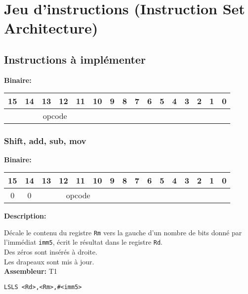 \section{Jeu d'instructions (Instruction Set Architecture)}

\subsection{Instructions à implémenter}

\textbf{Binaire:}\\

\begin{tabular}{| c c c c c c c c c c c c c c c c |}
\hline
15 & 14 & 13 & 12 & 11 & 10 & \multicolumn{1}{|c}{9} & 8 & 7 & 6 & 5 & 4 & 3 & 2 & 1 & 0 \\
\hline
\multicolumn{6}{|c}{opcode} & \multicolumn{10}{|c|}{} \\
\hline
\end{tabular}


\subsubsection{Shift, add, sub, mov}

\textbf{Binaire:}\\

\begin{tabular}{| c c c c c c c c c c c c c c c c |}
\hline
15 & 14 & \multicolumn{1}{|c}{13} & 12 & 11 & 10 & 9 & \multicolumn{1}{|c}{8} & 7 & 6 & 5 & 4 & 3 & 2 & 1 & 0 \\
\hline
0 & 0 & \multicolumn{5}{|c}{opcode} & \multicolumn{9}{|c|}{} \\
\hline
\end{tabular}



\textbf{Description: }

Décale le contenu du registre \texttt{Rm} vers la gauche d'un nombre de bits donné par l'immédiat \texttt{imm5}, écrit le résultat dans le registre \texttt{Rd}.\\
Des zéros sont insérés à droite.\\
Les drapeaux sont mis à jour.\\

\textbf{Assembleur:} T1

\begin{lstlisting}
LSLS <Rd>,<Rm>,#<imm5>
\end{lstlisting}

